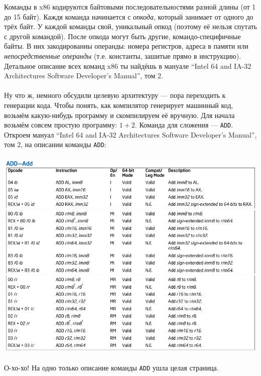 \documentclass[11pt]{book}
\begin{document}
Команды в x86 кодируются байтовыми последовательностями разной длины (от 1 до 15 байт).
Каждя команда начинается с \emph{опкода}, который занимает от одного до трёх байт.
У каждой команды свой, уникальный опкод (поэтому её нельзя спутать с другой командой).
После опкода могут быть другие, командо-специфичные байты. В них закодированиы
операнды: номера регистров, адреса в памяти или \emph{непосредственные операнды}
(т.е. константы, зашитые прямо в инструкцию). Детальное описание всех команд x86
ты найдёшь в мануале ``Intel 64 and IA-32 Architectures Software Developer's Manual'', том 2.
\\ \\
Ну что ж, немного обсудили целевую архитектуру --- пора переходить к генерации кода.
Чтобы понять, как компилятор генерирует машинный код, возьмём какую-нибудь программу и скомпилируем её вручную.
Для начала возьмём совсем простую программу: $1 + 2$.
Команда для сложения --- \texttt{ADD}.
Откроем мануал ``Intel 64 and IA-32 Architectures Software Developer's Manual'', том 2, на описании команды \texttt{ADD}:
\\ \\
\includegraphics[width=6.5in]{pic/21a.png}
\\
\includegraphics[width=6.5in]{pic/21b.png}
\\
\includegraphics[width=6.5in]{pic/21c.png}
\\ \\
О-хо-хо! На одно только описание команды \texttt{ADD} ушла целая страница.
\end{document}
